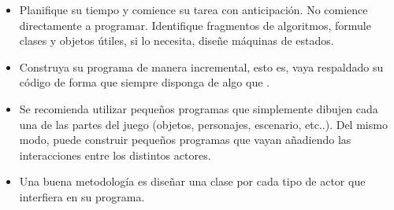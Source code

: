 \documentclass[letterpaper,11pt]{article} %
\begin{document}

\begin{itemize}
	\item Planifique su tiempo y comience su tarea con anticipación. No comience directamente a programar. Identifique fragmentos de algoritmos, formule clases y objetos útiles, si lo necesita, diseñe máquinas de estados.
	\item Construya su programa de manera incremental, esto es, vaya respaldado su código de forma que siempre disponga de algo que .
	\item Se recomienda utilizar pequeños programas que simplemente dibujen cada una de las partes del juego (objetos, personajes, escenario, etc..). Del mismo modo, puede construir pequeños programas que vayan añadiendo las interacciones entre los distintos actores.
	\item Una buena metodología es diseñar una clase por cada tipo de actor que interfiera en su programa.
\end{itemize}

\end{document}
